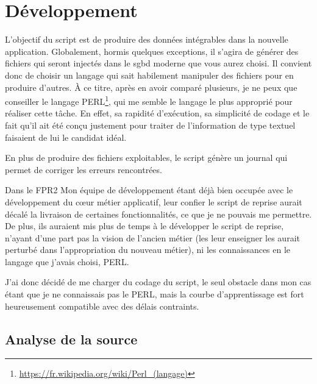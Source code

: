 \documentclass{book}
\begin{document}
\section{Développement}

L'objectif du script est de produire des données intégrables dans la nouvelle application. Globalement, hormis quelques exceptions, il s'agira de générer des fichiers qui seront injectés dans le \gls{sgbd} moderne que vous aurez choisi. Il convient donc de choisir un langage qui sait habilement manipuler des fichiers pour en produire d'autres. À ce titre, après en avoir comparé plusieurs, je ne peux que conseiller le langage PERL\footnote{\url{https://fr.wikipedia.org/wiki/Perl_(langage)}}, qui me semble le langage le plus approprié pour réaliser cette tâche. En effet, sa rapidité d'exécution, sa simplicité de codage et le fait qu'il ait été conçu justement pour traiter de l'information de type textuel faisaient de lui le candidat idéal.

En plus de produire des fichiers exploitables, le script génère un journal qui permet de corriger les erreurs rencontrées.

\begin{bclogo}[arrondi = 0.1, couleur = blue!10, logo = \bcinfo]{Dans le FPR2}
Mon équipe de développement étant déjà bien occupée avec le développement du cœur métier applicatif, leur confier le script de reprise aurait décalé la livraison de certaines fonctionnalités, ce que je ne pouvais me permettre. De plus, ils auraient mis plus de temps à le développer le script de reprise, n'ayant d'une part pas la vision de l'ancien métier (les leur enseigner les aurait perturbé dans l'appropriation du nouveau métier), ni les connaissances en le langage que j'avais choisi, PERL.

J'ai donc décidé de me charger du codage du script, le seul obstacle dans mon cas étant que je ne connaissais pas le PERL, mais la courbe d'apprentissage est fort heureusement compatible avec des délais contraints.
\end{bclogo}

\subsection{Analyse de la source}
\end{document}
